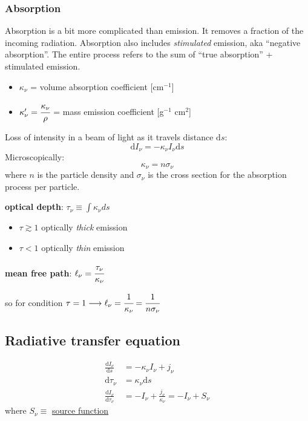 \documentclass[11pt]{article}
\newcommand{\mar}[1]{\hspace{0pt}\marginpar{-\textcolor{black}{#1}-}}
\begin{document}
\subsubsection{Absorption}
Absorption is a bit more complicated than emission. It removes a fraction
of the incoming radiation. Absorption also includes \textit{stimulated}
emission, aka ``negative absorption''. The entire process refers to the sum
of ``true absorption'' + stimulated emission.
\begin{itemize}[label={}, itemsep=0ex]
    \item \mar{26}$\kappa_{\nu}$ =  volume absorption coefficient [cm$^{-1}$]
    \item $\kappa'_{\nu} = \cfrac{\kappa_{\nu}}{\rho}$
        = mass emission coefficient [g$^{-1}$ cm$^{2}$]
\end{itemize}
Loss of intensity in a beam of light as it travels distance $\mathrm{d}s$:
\[
    \mathrm{d}I_{\nu} = -\kappa_{\nu}I_{\nu}\mathrm{d}s
    \]
Microscopically:
\[
    \kappa_{\nu} = n\sigma_{\nu}
    \]
where $n$ is the particle density and $\sigma_{\nu}$ is the cross section
for the absorption process per particle.

\textbf{optical depth}: $ \tau_{\nu} \equiv \int{\kappa_{\nu}ds} $
\begin{itemize}
    \item $\tau \gtrsim 1$ optically \emph{thick} emission
    \item $\tau < 1$ optically \emph{thin} emission
\end{itemize}

\textbf{mean free path}: $ \ell_{\nu} = \cfrac{\tau_{\nu}}{\kappa_{\nu}} $

so for condition $\tau=1 \longrightarrow \ell_{\nu} = \cfrac{1}{\kappa_{\nu}} =
\cfrac{1}{n\sigma_{\nu}}$

\newpage
\subsection{Radiative transfer equation}
\begin{align*}
    \frac{\mathrm{d}I_{\nu}}{\mathrm{d}s} &= -\kappa_{\nu}I_{\nu} + j_{\nu}\\
    \mathrm{d}\tau_{\nu} &= \kappa_{\nu}\mathrm{d}s\\
    \frac{\mathrm{d}I_{\nu}}{\mathrm{d}\tau_{\nu}} &=
    -I_{\nu} + \frac{j_{\nu}}{\kappa_{\nu}} = -I_{\nu} + S_{\nu}
\end{align*}
where $S_{\nu} \equiv$ \underline{source function}
\end{document}
